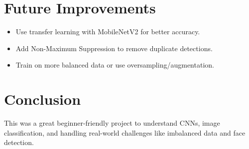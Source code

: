 \documentclass[12pt]{article}
\begin{document}
\section*{Future Improvements}
\begin{itemize}
    \item Use transfer learning with MobileNetV2 for better accuracy.
    \item Add Non-Maximum Suppression to remove duplicate detections.
    \item Train on more balanced data or use oversampling/augmentation.
\end{itemize}

\section*{Conclusion}
This was a great beginner-friendly project to understand CNNs, image classification, and handling real-world challenges like imbalanced data and face detection.
\end{document}
